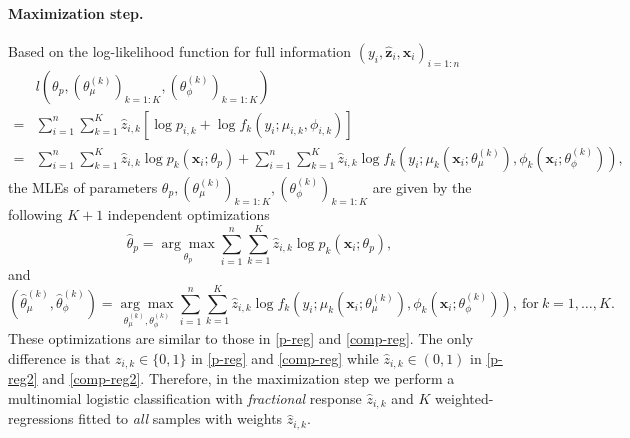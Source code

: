 \documentclass[11pt]{article}
\numberwithin{equation}{section}
\def\bx{\boldsymbol{x}}
\def\bz{\boldsymbol{z}}
\begin{document}
\paragraph{Maximization step.}
	Based on the log-likelihood function for full information $(y_i,\hat{\bz}_i,\bx_i)_{i=1:n}$
	\begin{equation}\label{likelihood}
		\begin{aligned}
			&l\left(\theta_p, (\theta_\mu^{(k)})_{k=1:K}, (\theta_\phi^{(k)})_{k=1:K}\right)\\
			=&\sum_{i=1}^n\sum_{k=1}^K \hat{z}_{i,k}\left[\log p_{i,k} + \log f_k\left(y_i;\mu_{i,k},\phi_{i,k}\right)\right]\\
			=&\sum_{i=1}^n\sum_{k=1}^K \hat{z}_{i,k}\log p_k(\bx_i;\theta_p) + \sum_{i=1}^n\sum_{k=1}^K \hat{z}_{i,k}\log f_k\left(y_i;\mu_k\left(\bx_i;\theta_\mu^{(k)}\right),\phi_k\left(\bx_i;\theta_\phi^{(k)}\right)\right),
		\end{aligned}
	\end{equation}
 the MLEs of parameters $\theta_p, (\theta_\mu^{(k)})_{k=1:K}, (\theta_\phi^{(k)})_{k=1:K}$ are given by the following $K+1$ independent optimizations
 	\begin{equation}\label{p-reg2}
 	\hat{\theta}_p=\underset{\theta_p}{\arg\max}\sum_{i=1}^n\sum_{k=1}^K\hat{z}_{i,k}\log p_k(\bx_i;\theta_p),
 \end{equation}
 and
 \begin{equation}\label{comp-reg2}
 	\left(\hat{\theta}_\mu^{(k)},\hat{\theta}_\phi^{(k)}\right)=\underset{\theta^{(k)}_\mu,\theta^{(k)}_\phi}{\arg\max}\sum_{i=1}^n\sum_{k=1}^K\hat{z}_{i,k}\log f_k\left(y_i;\mu_k\left(\bx_i;\theta_\mu^{(k)}\right),\phi_k\left(\bx_i;\theta_\phi^{(k)}\right)\right), ~\text{for} ~ k=1,\ldots,K.
 \end{equation}
These optimizations are similar to those in \eqref{p-reg} and \eqref{comp-reg}. 
The only difference is that ${z}_{i,k}\in\{0,1\}$ in \eqref{p-reg} and \eqref{comp-reg} while $\hat{z}_{i,k}\in(0,1)$ in  \eqref{p-reg2} and \eqref{comp-reg2}.
Therefore, in the maximization step we perform a multinomial logistic classification with {\it fractional} response $\hat{z}_{i,k}$ and $K$ {weighted}-regressions fitted to {\it all} samples with weights $\hat{z}_{i,k}$.
\end{document}
